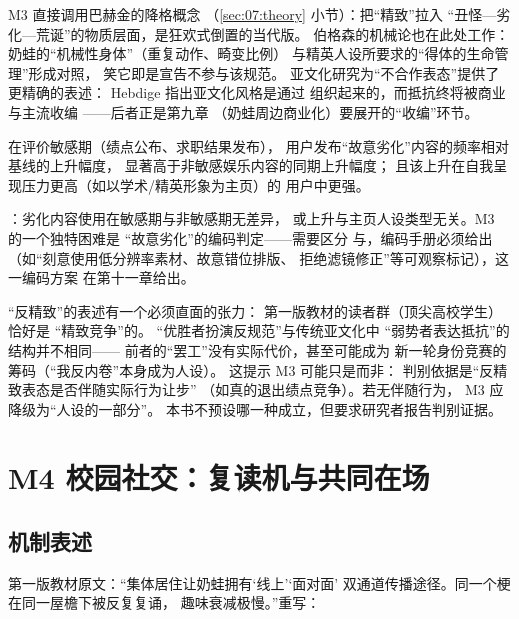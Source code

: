 M3 直接调用巴赫金的降格概念
（\ref{sec:07:theory} 小节）：把“精致”拉入
“丑怪—劣化—荒诞”的物质层面，是狂欢式倒置的当代版。
伯格森的机械论也在此处工作：
奶蛙的“机械性身体”（重复动作、畸变比例）
与精英人设所要求的“得体的生命管理”形成对照，
笑它即是宣告不参与该规范\cite{bergson1900rire}。
亚文化研究为“不合作表态”提供了更精确的表述：
Hebdige 指出亚文化风格是通过
组织起来的，而抵抗终将被商业与主流收编
\cite{hebdige1979subculture}——后者正是第九章
（奶蛙周边商业化）要展开的“收编”环节。

\begin{hypothesis}[H7.3 反精致假设]\label{hyp:07:m3}
  在评价敏感期（绩点公布、求职结果发布），
  用户发布“故意劣化”内容的频率相对基线的上升幅度，
  显著高于非敏感娱乐内容的同期上升幅度；
  且该上升在自我呈现压力更高（如以学术/精英形象为主页）的
  用户中更强。
\end{hypothesis}

：劣化内容使用在敏感期与非敏感期无差异，
或上升与主页人设类型无关。M3 的一个独特困难是
“故意劣化”的编码判定——需要区分
与，编码手册必须给出
（如“刻意使用低分辨率素材、故意错位排版、
拒绝滤镜修正”等可观察标记），这一编码方案
在第十一章给出。

\begin{nlcritique}
  “反精致”的表述有一个必须直面的张力：
  第一版教材的读者群（顶尖高校学生）恰好是
  “精致竞争”的。
  “优胜者扮演反规范”与传统亚文化中
  “弱势者表达抵抗”的结构并不相同——
  前者的“罢工”没有实际代价，甚至可能成为
  新一轮身份竞赛的筹码（“我反内卷”本身成为人设）。
  这提示 M3 可能只是而非：
  判别依据是“反精致表态是否伴随实际行为让步”
  （如真的退出绩点竞争）。若无伴随行为，
  M3 应降级为“人设的一部分”。
  本书不预设哪一种成立，但要求研究者报告判别证据。
\end{nlcritique}

\section{M4 校园社交：复读机与共同在场}\label{sec:07:m4}

\subsection{机制表述}

第一版教材原文：“集体居住让奶蛙拥有‘线上’‘面对面’
双通道传播途径。同一个梗在同一屋檐下被反复复诵，
趣味衰减极慢。”重写：

